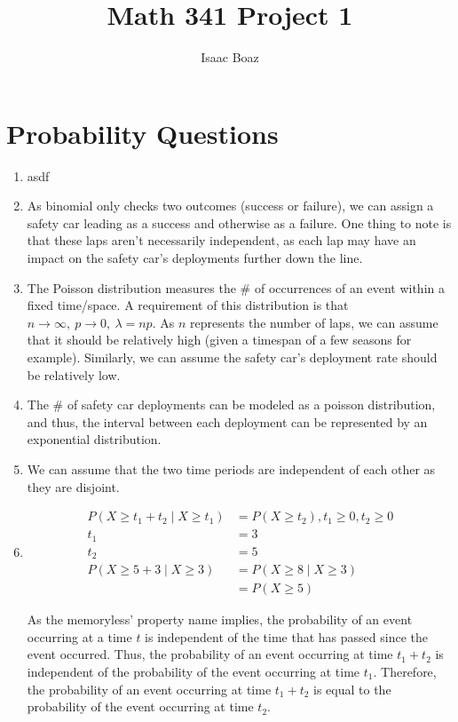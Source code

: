 \documentclass{article}
\title{\vspace{-4ex}Math 341 Project 1}
\author{Isaac Boaz}
\begin{document}
\maketitle

\section*{Probability Questions}

\begin{enumerate}
    \item asdf
    \item As binomial only checks two outcomes (success or failure), we can assign a safety car leading as a success and otherwise as a failure. One thing to note is that these laps aren't necessarily independent, as each lap may have an impact on the safety car's deployments further down the line.
    \item The Poisson distribution measures the \# of occurrences of an event within a fixed time/space. A requirement of this distribution is that \(n \rightarrow \infty,\ p \rightarrow 0,\ \lambda = np\). As \(n\) represents the number of laps, we can assume that it should be relatively high (given a timespan of a few seasons for example). Similarly, we can assume the safety car's deployment rate should be relatively low.
    \item The \# of safety car deployments can be modeled as a poisson distribution, and thus, the interval between each deployment can be represented by an exponential distribution.
    \item We can assume that the two time periods are independent of each other as they are disjoint.
    \item
          \begin{align*}
              P(X \geq t_1 + t_2 \mid X \geq t_1) & = P(X \geq t_2), t_1 \geq 0, t_2 \geq 0 \\
              t_1                                 & = 3                                     \\
              t_2                                 & = 5                                     \\
              P(X \geq 5 + 3 \mid X \geq 3)       & = P(X \geq 8 \mid X \geq 3)             \\
                                                  & = P(X \geq 5)
          \end{align*}

          As the memoryless' property name implies, the probability of an event occurring at a time \(t\) is independent of the time that has passed since the event occurred. Thus, the probability of an event occurring at time \(t_1 + t_2\) is independent of the probability of the event occurring at time \(t_1\). Therefore, the probability of an event occurring at time \(t_1 + t_2\) is equal to the probability of the event occurring at time \(t_2\).
\end{enumerate}
\end{document}
